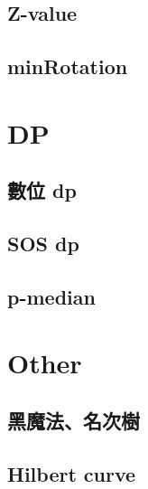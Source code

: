 \documentclass[a4paper,10pt,twocolumn,oneside]{article}
\begin{document}
\subsection{Z-value}

\subsection{minRotation}

\section{DP}
\subsection{數位 dp}

\subsection{SOS dp}

\subsection{p-median}

\section{Other}
\subsection{黑魔法、名次樹}

%
\subsection{Hilbert curve}

\end{document}
